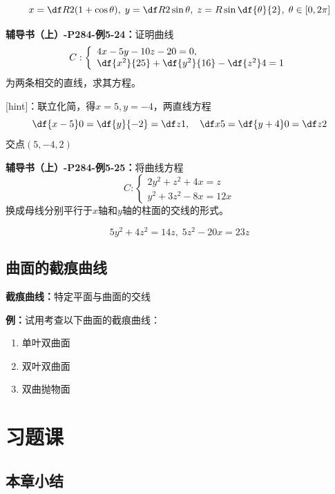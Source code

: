 $${x=\df R2(1+\cos\theta),\;y=\df
R2\sin\theta,\;z=R\sin\df{\theta}{2},\;\theta\in[0,2\pi]}$$

{\bf 辅导书（上）-P284-例5-24：}证明曲线$$C:\left\{\begin{array}{l}
	4x-5y-10z-20=0,\\ \df{x^2}{25}+\df{y^2}{16}-\df{z^2}4=1
\end{array}\right.$$
为两条相交的直线，求其方程。

[hint]：联立化简，得$x=5,y=-4$，两直线方程
$$\df{x-5}0=\df{y}{-2}=\df z1,\quad \df x5=\df{y+4}0=\df z2$$
交点$(5,-4,2)$

{\bf 辅导书（上）-P284-例5-25：}将曲线方程$$C:\left\{\begin{array}{l}
	2y^2+z^2+4x=z\\ y^2+3z^2-8x=12x
\end{array}\right.$$
换成母线分别平行于$x$轴和$y$轴的柱面的交线的形式。

$$5y^2+4z^2=14z,\;5z^2-20x=23z$$
\subsection{曲面的截痕曲线}

{\bf 截痕曲线：}特定平面与曲面的交线

{\bf 例：}试用考查以下曲面的截痕曲线：
\begin{enumerate}[(1)]
  \setlength{\itemindent}{1cm}
  \item 单叶双曲面
  \item 双叶双曲面
  \item 双曲抛物面
\end{enumerate}

\section{习题课}

\subsection{本章小结}

